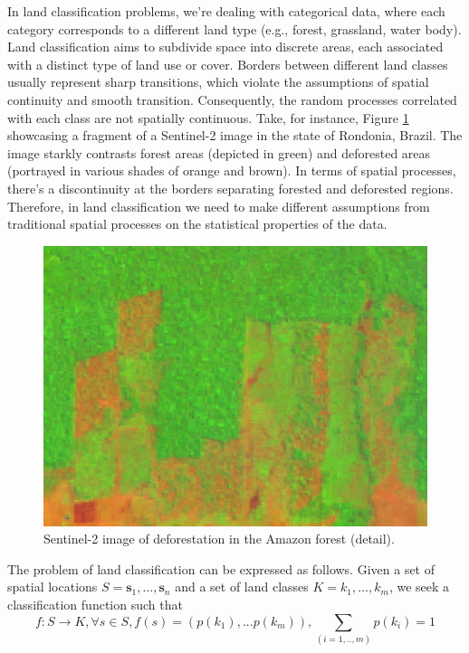 \documentclass[
  shortnames]{jss}
\begin{document}
In land classification problems, we're dealing with categorical data, where each category corresponds to a different land type (e.g., forest, grassland, water body). Land classification aims to subdivide space into discrete areas, each associated with a distinct type of land use or cover. Borders between different land classes usually represent sharp transitions, which violate the assumptions of spatial continuity and smooth transition. Consequently, the random processes correlated with each class are not spatially continuous. Take, for instance, Figure \ref{fig:roim} showcasing a fragment of a Sentinel-2 image in the state of Rondonia, Brazil. The image starkly contrasts forest areas (depicted in green) and deforested areas (portrayed in various shades of orange and brown). In terms of spatial processes, there's a discontinuity at the borders separating forested and deforested regions. Therefore, in land classification we need to make different assumptions from traditional spatial processes on the statistical properties of the data.

\begin{CodeChunk}
\begin{figure}[h]

{\centering \includegraphics[width=4.6in]{images/rondonia_image} 

}

\caption[Sentinel-2 image of deforestation in the Amazon forest (detail)]{Sentinel-2 image of deforestation in the Amazon forest (detail).}\label{fig:roim}
\end{figure}
\end{CodeChunk}

The problem of land classification can be expressed as follows. Given a set of spatial locations \(S = {\mathbf{s}_1, ..., \mathbf{s}_n}\) and a set of land classes \(K = {k_1, ..., k_m}\), we seek a classification function such that
\begin{equation}
f: S \to K, \forall s \in S, f(s) = (p(k_1), ...p(k_m)), \sum_{(i = 1,..,m)}p(k_i) = 1
\end{equation}
\end{document}
